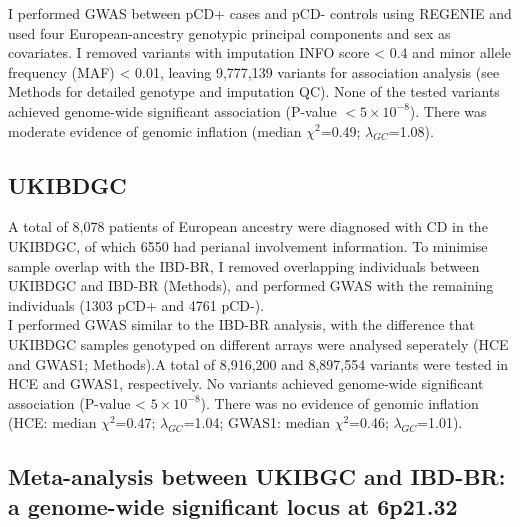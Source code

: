 I performed GWAS between pCD+ cases and pCD- controls using REGENIE and used four European-ancestry genotypic principal components and sex as covariates. I removed variants with imputation INFO score < 0.4 and minor allele frequency (MAF) < 0.01, leaving 9,777,139 variants for association analysis (see Methods for detailed genotype and imputation QC). None of the tested variants achieved genome-wide significant association (P-value $< 5\times10^{-8}$). There was moderate evidence of genomic inflation (median $\chi^{2}$=0.49; $\lambda_{GC}$=1.08).
\subsection{UKIBDGC}
A total of 8,078 patients of European ancestry were diagnosed with CD in the UKIBDGC, of which 6550 had perianal involvement information. To minimise sample overlap with the IBD-BR, I removed overlapping individuals between UKIBDGC and IBD-BR (Methods), and performed GWAS with the remaining individuals (1303 pCD+ and 4761 pCD-). \\

I performed GWAS similar to the IBD-BR analysis, with the difference that UKIBDGC samples genotyped on different arrays were analysed seperately (HCE and GWAS1; Methods).A total of 8,916,200 and 8,897,554 variants were tested in HCE and GWAS1, respectively. No variants achieved genome-wide significant association (P-value < $5\times10^{-8}$). There was no evidence of genomic inflation (HCE: median $\chi^{2}$=0.47; $\lambda_{GC}$=1.04; GWAS1: median $\chi^{2}$=0.46; $\lambda_{GC}$=1.01).

\subsection{Meta-analysis between UKIBGC and IBD-BR: a genome-wide significant locus at 6p21.32}

